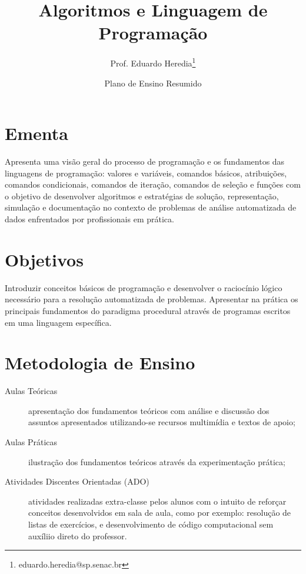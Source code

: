 \documentclass[a4paper]{article}
\title{Algoritmos e Linguagem de Programação}
\author{Prof. Eduardo Heredia\footnote{eduardo.heredia@sp.senac.br}}
\date{Plano de Ensino Resumido\\\tiny{\versao}}
\begin{document}
    \maketitle

    \section{Ementa}

        Apresenta uma visão geral do processo de programação e os
        fundamentos das linguagens de programação: valores e variáveis,
        comandos básicos, atribuições, comandos condicionais, comandos
        de iteração, comandos de seleção e funções com o objetivo de
        desenvolver algoritmos e estratégias de solução, representação,
        simulação e documentação no contexto de problemas de análise
        automatizada de dados enfrentados por profissionais em
        prática.

    \section{Objetivos}

        Introduzir conceitos básicos de programação e desenvolver o
        raciocínio lógico necessário para a resolução automatizada de
        problemas. Apresentar na prática os principais fundamentos do
        paradigma procedural através de programas escritos em uma
        linguagem específica.

    \section{Metodologia de Ensino}

        \begin{description}

            \item[Aulas Teóricas] apresentação dos fundamentos teóricos
                com análise e discussão dos assuntos apresentados
                utilizando-se recursos multimídia e textos de apoio;

            \item[Aulas Práticas] ilustração dos fundamentos teóricos
                através da experimentação prática;

            \item[Atividades Discentes Orientadas (ADO)] atividades
               realizadas extra-classe pelos alunos com o intuito de
               reforçar conceitos desenvolvidos em sala de aula, como
               por exemplo: resolução de listas de exercícios, e
               desenvolvimento de código computacional sem auxíliio direto
               do professor.

        \end{description}
\end{document}
